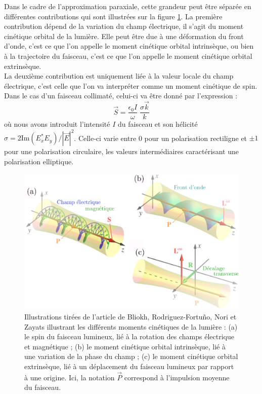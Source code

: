 \documentclass[a4paper,11pt]{article} %
\begin{document}
	Dans le cadre de l'approximation paraxiale, cette grandeur peut être séparée en différentes contributions qui sont illustrées sur la figure \ref{fig:moments_angulaires}. La première contribution dépend de la variation du champ électrique, il s'agit du moment cinétique orbital de la lumière. Elle peut être due à une déformation du front d'onde, c'est ce que l'on appelle le moment cinétique orbital intrinsèque, ou bien à la trajectoire du faisceau, c'est ce que l'on appelle le moment cinétique orbital extrinsèque.\\
	
	La deuxième contribution est uniquement liée à la valeur locale du champ électrique, c'est celle que l'on va interpréter comme un moment cinétique de spin. Dans le cas d'un faisceau collimaté, celui-ci va être donné par l'expression :
	\begin{equation*}
		\vec{S} = \frac{\epsilon_0 I}{\omega} \; \frac{\sigma \vec{k}}{k}
	\end{equation*}
	où nous avons introduit l'intensité $ I $ du faisceau et son hélicité $ \sigma = 2 \text{Im}(E_x^* E_y) / |\vec{E}|^2 $. Celle-ci varie entre 0 pour un polarisation rectiligne et $\pm 1 $ pour une polarisation circulaire, les valeurs intermédiaires caractérisant une polarisation elliptique.
	
	\begin{figure}[h]
		\centering
		\begin{minipage}[c]{0.9\linewidth}
			\centering
			\includegraphics[width=0.8\linewidth]{./Illustrations/moments_angulaires}
			\caption{Illustrations tirées de l'article de Bliokh, Rodriguez-Fortuño, Nori et Zayats illustrant les différents moments cinétiques de la lumière : (a) le spin du faisceau lumineux, lié à la rotation des champs électrique et magnétique ; (b) le moment cinétique orbital intrinsèque, lié à une variation de la phase du champ ; (c) le moment cinétique orbital extrinsèque, lié à un déplacement du faisceau lumineux par rapport à une origine. Ici, la notation $ \vec{P} $ correspond à l'impulsion moyenne du faisceau.}
			\label{fig:moments_angulaires}
		\end{minipage}
	\end{figure}
	
\end{document}
